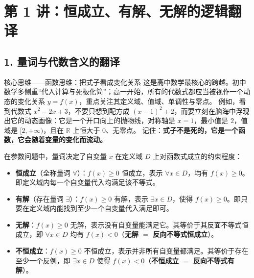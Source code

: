 \documentclass[11pt,a4paper]{ctexart}
\begin{document}
\newpage

\section{第 1 讲：恒成立、有解、无解的逻辑翻译}

\subsection{1. 量词与代数含义的翻译}

\begin{keybox}{核心思维——函数思维：把式子看成变化关系}
这是高中数学最核心的跨越。初中数学多侧重“代入计算与死板化简”；高一开始，所有的代数式都应当被视作一个动态的变化关系 $y=f(x)$，重点关注其定义域、值域、单调性与零点。
例如，看到代数式 $x^2-2x+3$，不要只想到配方成 $(x-1)^2+2$，而要立刻在脑海中浮现出它的动态画像：它是一个开口向上的抛物线，对称轴是 $x=1$，最小值是 $2$，值域是 $[2,+\infty)$，且在 $\mathbb{R}$ 上恒大于 0、无零点。
记住：\textbf{式子不是死的，它是一个函数，它会随着变量的变化而流动。}
\end{keybox}
在参数问题中，量词决定了自变量 $x$ 在定义域 $D$ 上对函数式成立的约束程度：
\begin{itemize}
  \item \textbf{恒成立}（全称量词 $\forall$）：$f(x) \ge 0$ 恒成立，表示 $\forall x \in D$，均有 $f(x) \ge 0$。即定义域内每一个自变量代入均满足该不等式。
  \item \textbf{有解}（存在量词 $\exists$）：$f(x) \ge 0$ 有解，表示 $\exists x \in D$，使得 $f(x) \ge 0$。即只要在定义域内能找到至少一个自变量代入满足即可。
  \item \textbf{无解}：$f(x) \ge 0$ 无解，表示没有自变量能满足它。其等价于其反面不等式恒成立，即 $\forall x \in D$ 均有 $f(x) < 0$（\textbf{无解 $=$ 反向不等式恒成立}）。
  \item \textbf{不恒成立}：$f(x) \ge 0$ 不恒成立，表示并非所有自变量都满足。其等价于存在至少一个反例，即 $\exists x \in D$ 使得 $f(x) < 0$（\textbf{不恒成立 $=$ 反向不等式有解}）。
\end{itemize}
\end{document}
